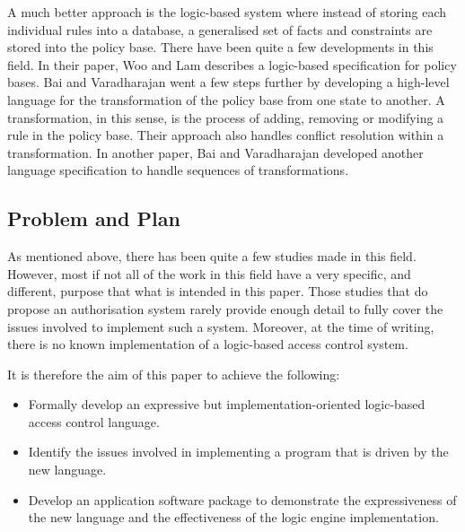 \documentclass[a4paper]{article}
\begin{document}
      A much better approach is the logic-based system where instead of
      storing each individual rules into a database, a generalised set of
      facts and constraints are stored into the policy base. There have been
      quite a few developments in this field. In their paper, Woo and Lam
      \cite{WL} describes a logic-based specification for policy bases. Bai and
      Varadharajan \cite{BV1} went a few steps further by developing a
      high-level language for the transformation of the policy base from one
      state to another. A transformation, in this sense, is the process of
      adding, removing or modifying a rule in the policy base. Their approach
      also handles conflict resolution within a transformation. In another
      paper, Bai and Varadharajan \cite{BV2} developed another language
      specification to handle sequences of transformations.

    \subsection{Problem and Plan}

      As mentioned above, there has been quite a few studies made in this
      field. However, most if not all of the work in this field have a very
      specific, and different, purpose that what is intended in this paper.
      Those studies that do propose an authorisation system rarely provide
      enough detail to fully cover the issues involved to implement such a
      system. Moreover, at the time of writing, there is no known
      implementation of a logic-based access control system.

      It is therefore the aim of this paper to achieve the following:

      \begin{itemize}
        \item
          Formally develop an expressive but implementation-oriented
          logic-based access control language.
        \item
          Identify the issues involved in implementing a program that is
          driven by the new language.
        \item
          Develop an application software package to demonstrate the
          expressiveness of the new language and the effectiveness of the
          logic engine implementation.
          
      \end{itemize}
\end{document}

